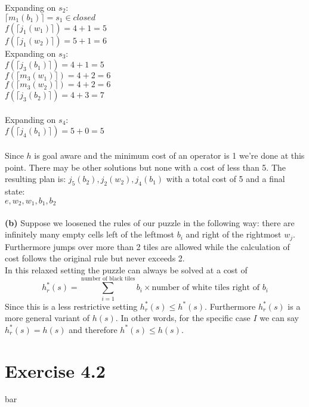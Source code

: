 \documentclass[11pt,a4paper]{article}
\begin{document}
Expanding on $s_2$:\\
$\lceil m_1(b_1)\rceil=s_1\in closed$\\
$f(\lceil j_1(w_1)\rceil)=4+1=5$\\
$f(\lceil j_1(w_2)\rceil)=5+1=6$\\
Expanding on $s_3$:\\
$f(\lceil j_3(b_1)\rceil)=4+1=5$\\
$f(\lceil m_3(w_1)\rceil)=4+2=6$\\
$f(\lceil m_3(w_2)\rceil)=4+2=6$\\
$f(\lceil j_3(b_2)\rceil)=4+3=7$\\
\\
Expanding on $s_4$:\\
$f(\lceil j_4(b_1)\rceil)=5+0=5$\\
\\
Since $h$ is goal aware and the minimum cost of an operator is 1 we're done at this point. There may be other solutions but none with a cost of less than 5. The resulting plan is: $j_5(b_2),j_2(w_2),j_4(b_1)$ with a total cost of 5 and a final state:\\
$e,w_2,w_1,b_1,b_2$\\
\\
\textbf{(b)} Suppose we loosened the rules of our puzzle in the following way: there are infinitely many empty cells left of the leftmost $b_i$ and right of the rightmost $w_j$. Furthermore jumps over more than 2 tiles are allowed while the calculation of cost follows the original rule but never exceeds 2.\\
In this relaxed setting the puzzle can always be solved at a cost of\\
\begin{equation*}
h_r^*(s) = \sum_{i=1}^{\text{number of black tiles}} b_i\times \text{number of white tiles right of }b_i
\end{equation*}
Since this is a less restrictive setting $h_r^*(s)\leq h^*(s)$. Furthermore $h_r^*(s)$ is a more general variant of $h(s)$. In other words, for the specific case $I$ we can say $h_r^*(s)=h(s)$ and therefore $h^*(s)\leq h(s)$.

\section*{Exercise 4.2}
bar
\end{document}

